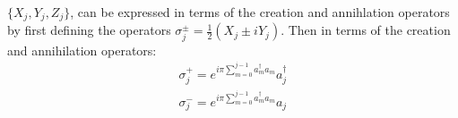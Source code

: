 $\{X_j, Y_j, Z_j\}$, can be expressed in terms of the creation and annihlation operators by first defining
the operators $\sigma^{\pm}_j = \frac{1}{2}(X_j \pm iY_j)$. Then in terms of the creation and annihilation
operators:
\begin{align}
    \sigma^{+}_j = e^{i\pi\sum^{j-1}_{m = 0} a^{\dagger}_m a_m} a_j^{\dagger} \\
    \sigma^{-}_j = e^{i\pi\sum^{j-1}_{m = 0} a^{\dagger}_m a_m} a_j
\end{align}















